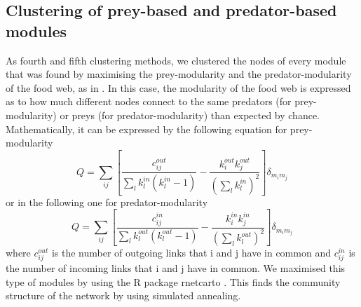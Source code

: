 \documentclass[twocolumn]{article}
\begin{document}
	\subsection*{Clustering of prey-based and predator-based modules}
		As fourth and fifth clustering methods, we clustered the nodes of every module that was found by maximising the prey-modularity and the predator-modularity of the food web, as in \citet{Guimera2010}. In this case, the modularity of the food web is expressed as to how much different nodes connect to the same predators (for prey-modularity) or preys (for predator-modularity) than expected by chance. Mathematically, it can be expressed by the following equation \citep{Guimera2007} for prey-modularity
		\begin{equation}
			Q=\sum_{ij}{\left[\frac{c_{ij}^{out}}{\sum_{l}{k_l^{in}\left(k_l^{in}-1\right)}}-\frac{k_i^{out}k_j^{out}}{\left(\sum_{l} k_l^{in}\right)^2}\right]\delta_{m_im_j}}
		\end{equation}
		or in the following one for predator-modularity
		\begin{equation}
			Q=\sum_{ij}{\left[\frac{c_{ij}^{in}}{\sum_{l}{k_l^{out}\left(k_l^{out}-1\right)}}-\frac{k_i^{in}k_j^{in}}{\left(\sum_{l} k_l^{out}\right)^2}\right]\delta_{m_im_j}}
		\end{equation}
		where $c_{ij}^{out}$ is the number of outgoing links that i and j have in common and $c_{ij}^{in}$ is the number of incoming links that i and j have in common.
		We maximised this type of modules by using the R package rnetcarto \citep{Doulcier2015}. This finds the community structure of the network by using simulated annealing.  %
\end{document}
